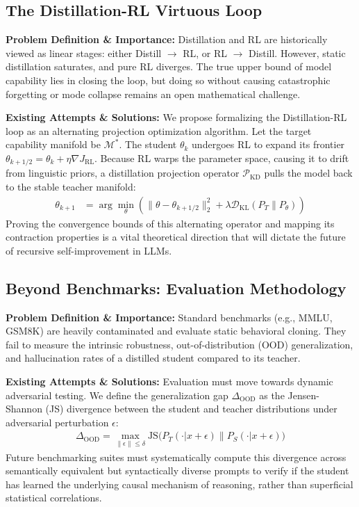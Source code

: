 \documentclass{article} %
\begin{document}
\subsection{The Distillation-RL Virtuous Loop}
\textbf{Problem Definition \& Importance:} Distillation and RL are historically viewed as linear stages: either Distill $\to$ RL, or RL $\to$ Distill. However, static distillation saturates, and pure RL diverges. The true upper bound of model capability lies in closing the loop, but doing so without causing catastrophic forgetting or mode collapse remains an open mathematical challenge.

\textbf{Existing Attempts \& Solutions:} We propose formalizing the Distillation-RL loop as an alternating projection optimization algorithm. Let the target capability manifold be $\mathcal{M}^*$. The student $\theta_k$ undergoes RL to expand its frontier $\theta_{k+1/2} = \theta_k + \eta \nabla J_{\text{RL}}$. Because RL warps the parameter space, causing it to drift from linguistic priors, a distillation projection operator $\mathcal{P}_{\text{KD}}$ pulls the model back to the stable teacher manifold:
\begin{align}
\theta_{k+1} &= \arg\min_{\theta} \left( \parallel \theta - \theta_{k+1/2} \parallel_2^2 + \lambda \mathcal{D}_{\text{KL}}(P_T \parallel P_\theta) \right)
\end{align}
Proving the convergence bounds of this alternating operator and mapping its contraction properties is a vital theoretical direction that will dictate the future of recursive self-improvement in LLMs.

\subsection{Beyond Benchmarks: Evaluation Methodology}
\textbf{Problem Definition \& Importance:} Standard benchmarks (e.g., MMLU, GSM8K) are heavily contaminated and evaluate static behavioral cloning. They fail to measure the intrinsic robustness, out-of-distribution (OOD) generalization, and hallucination rates of a distilled student compared to its teacher.

\textbf{Existing Attempts \& Solutions:} Evaluation must move towards dynamic adversarial testing. We define the generalization gap $\Delta_{\text{OOD}}$ as the Jensen-Shannon (JS) divergence between the student and teacher distributions under adversarial perturbation $\epsilon$:
\begin{align}
\Delta_{\text{OOD}} = \max_{\parallel \epsilon \parallel \le \delta} \text{JS}\Big( P_T(\cdot | x + \epsilon) \parallel P_S(\cdot | x + \epsilon) \Big)
\end{align}
Future benchmarking suites must systematically compute this divergence across semantically equivalent but syntactically diverse prompts to verify if the student has learned the underlying causal mechanism of reasoning, rather than superficial statistical correlations.
\end{document}
